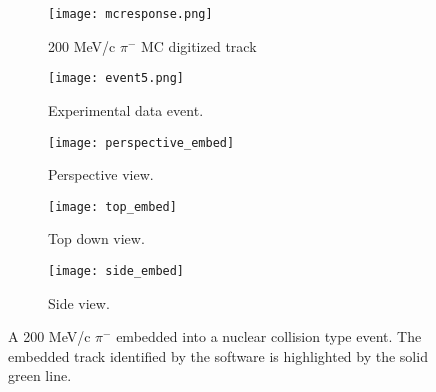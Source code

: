 
\begin{figure}[!htb]
    \centering
    \begin{subfigure}[t]{0.49\textwidth}
        \centering
        \texttt{[image: mcresponse.png]}
        \caption{200 MeV/c $\pi^-$ MC digitized track} \label{fig:mcevent}
    \end{subfigure}
    \hfill
    \begin{subfigure}[t]{.49\textwidth}
        \centering
        \texttt{[image: event5.png]} 
        \caption{Experimental data event.} \label{fig:dataevent}
    \end{subfigure}
    \caption{}
\label{fig:mcDataEmbedtrack}
\end{figure}



\begin{figure}[!htb]
    \centering
    \begin{subfigure}[t]{0.49\textwidth}
        \centering
        \texttt{[image: perspective\_embed]}
        \caption{Perspective view.} \label{fig:persEmbed}
    \end{subfigure}
    \hfill
    \begin{subfigure}[t]{.3\textwidth}
        \centering
        \texttt{[image: top\_embed]} 
        \caption{Top down view.} \label{fig:topEmbed}
    \end{subfigure}
     \hfill
    \begin{subfigure}[t]{\textwidth}
        \centering
        \texttt{[image: side\_embed]} 
        \caption{Side view.} \label{fig:sideEmbed}
    \end{subfigure}
    \caption{A 200 MeV/c $\pi^-$ embedded into a nuclear collision type event. The embedded track identified by the software is highlighted by the solid green line. }

\label{fig:embedtrack}
\end{figure}


